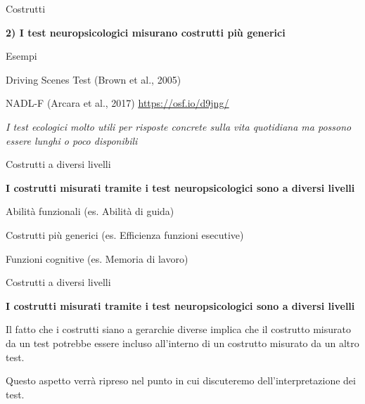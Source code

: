 \documentclass[
  ignorenonframetext,
]{beamer}
\begin{document}
\begin{frame}{Costrutti}
\label{costrutti-4}
\begin{center}
  \textbf{2) I test neuropsicologici misurano costrutti più generici}
\end{center}
\vspace{2em}

Esempi

Driving Scenes Test (Brown et al., 2005)

NADL-F (Arcara et al., 2017)
\href{https://osf.io/d9jng/}{\ul{https://osf.io/d9jng/}} \vspace{2em}

\emph{I test ecologici molto utili per risposte concrete sulla vita
quotidiana ma possono essere lunghi o poco disponibili}
\end{frame}

\begin{frame}{Costrutti a diversi livelli}
\label{costrutti-a-diversi-livelli}
\begin{center}
  \textbf{I costrutti misurati tramite i test neuropsicologici sono a diversi livelli}
  \vspace{2em}

  Abilità funzionali
  (es. Abilità di guida) 
  
  {\small Costrutti più generici
  (es. Efficienza funzioni esecutive)}
  
  {\footnotesize Funzioni cognitive
  (es. Memoria di lavoro)}
  
\end{center}
\end{frame}

\begin{frame}{Costrutti a diversi livelli}
\label{costrutti-a-diversi-livelli-1}
\begin{center}
  \textbf{I costrutti misurati tramite i test neuropsicologici sono a diversi livelli}
\end{center}
\vspace{2em}

Il fatto che i costrutti siano a gerarchie diverse implica che il
costrutto misurato da un test potrebbe essere incluso all'interno di un
costrutto misurato da un altro test.

Questo aspetto verrà ripreso nel punto in cui discuteremo
dell'interpretazione dei test.
\end{frame}
\end{document}
